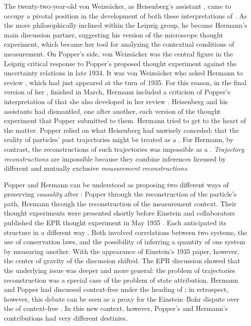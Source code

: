 \documentclass[final,12pt]{article}
\newcommand{\LdF}{\bt{Logik der Forschung}\xspace}
\newcommand{\TE}{thought experiment\xspace}
\newcommand{\UR}{uncertainty relations\xspace}
\newcommand{\vW}{von Weizsäcker\xspace}
\begin{document}
The twenty-two-year-old \vW, as Heisenberg's assistant \citep{Cassidy2015}, came to occupy a pivotal position in the development of both these interpretations of \qm. As the more philosophically inclined within the Leipzig group, he became Hermann's main discussion partner, suggesting his version of the microscope \TE, which became her tool for analyzing the contextual conditions of measurement. On Popper's side, \vW was the central figure in the Leipzig critical response to Popper's proposed \TE against the \UR in late 1934. It was \vW who asked Hermann to review \LdF, which had just appeared at the turn of 1935. For this reason, in the final version of her , finished in March, Hermann included a criticism of Popper's interpretation of \qm that she also developed in her review \citep{Hermann1935a}. Heisenberg and his assistants had dismantled, one after another, each version of the \TE that Popper submitted to them. Hermann tried to get to the heart of the matter. Popper relied on what Heisenberg had unwisely conceded: that the reality of particles' past trajectories might be treated as a . For Hermann, by contrast, the reconstructions of such trajectories was impossible as a . \emph{Trajectory reconstructions} are impossible because they combine inferences licensed by different and mutually exclusive \emph{measurement reconstructions}.

Popper and Hermann can be understood as proposing two different ways of preserving \emph{causality} after \qm: Popper through the reconstruction of the particle's path, Hermann through the reconstruction of the measurement context. Their thought experiments were presented shortly before Einstein and collaborators published the EPR \TE in May 1935 \citep{Einstein1935}. Each anticipated its structure in a different way \citep[176--181]{Jammer1974}. Both involved correlations between two systems, the use of conservation laws, and the possibility of inferring a quantity of one system by measuring another. With the appearance of Einstein's 1935 paper, however, the center of gravity of the discussion shifted. The EPR discussion showed that the underlying issue was deeper and more general: the problem of trajectories reconstruction was a special case of the problem of state attribution. Hermann and Popper had discussed context-free  under the heading of ; in retrospect, however, this debate can be seen as a proxy for the Einstein--Bohr dispute over the  of context-free . In this new context, however, Popper's and Hermann's contributions had very different destinies. 
\end{document}
